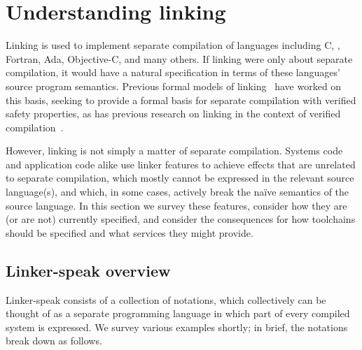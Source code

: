 \section{Understanding linking}
Linking is used to implement separate compilation 
of languages including C, \Cplusplus{}, Fortran, Ada, Objective-C, and
many others.
If linking were only about separate compilation, it would have a natural specification
in terms of these languages' source program semantics.
Previous formal models of linking~\cite{cardelli-program-1997, glew-type-safe-1999, machkasova-calculus-2000, wells-equational-2000, fagorzi-calculus-2007}
have worked on this basis, 
seeking to provide a formal basis for separate compilation with verified safety properties, as has
previous research on linking in the context of verified compilation~\cite{stewart-compositional-2015, kang-lightweight-2015}.

However, linking is not simply a matter of separate compilation.
Systems code and application code alike 
use linker features to achieve effects that are unrelated to separate compilation,
which mostly cannot be expressed in the relevant source language(s), 
and which, in some cases, actively break the na\"ive semantics of the source language.
In this section we survey these features,
consider how they are (or are not) currently specified, 
and consider the consequences for 
how toolchains should be specified and what services they might provide.

\subsection{Linker-speak overview}

Linker-speak consists of a collection of notations,
which collectively can be thought of as a separate programming language
in which part of every compiled system is expressed.
We survey various examples shortly; in brief, the notations
break down as follows.

